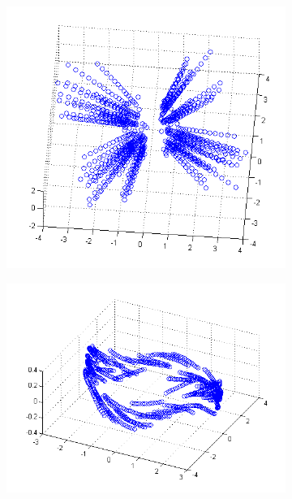 \documentclass[10pt,a4paper]{report}
\begin{document}
\begin{figure}
        \begin{subfigure}[b]{0.5\textwidth}
                \centering
                \includegraphics[width=\textwidth]{figures/contraction.png}
                \caption{}
        \end{subfigure}
        \begin{subfigure}[b]{0.5\textwidth}
                \centering
                \includegraphics[width=\textwidth]{figures/largeRsmallISsmallB.png}

\end{subfigure}
\end{figure}
\end{document}
